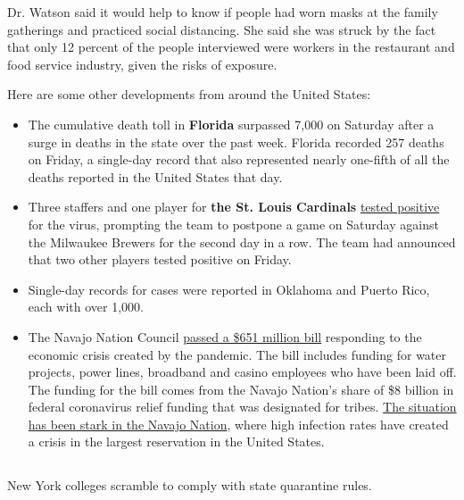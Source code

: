 Dr. Watson said it would help to know if people had worn masks at the
family gatherings and practiced social distancing. She said she was
struck by the fact that only 12 percent of the people interviewed were
workers in the restaurant and food service industry, given the risks of
exposure.

Here are some other developments from around the United States:

\begin{itemize}
\item
  The cumulative death toll in \textbf{Florida} surpassed 7,000 on
  Saturday after a surge in deaths in the state over the past week.
  Florida recorded 257 deaths on Friday, a single-day record that also
  represented nearly one-fifth of all the deaths reported in the United
  States that day.
\item
  Three staffers and one player for \textbf{the St. Louis Cardinals}
  \href{https://www.nytimes.com/2020/08/01/sports/baseball/coronavirus-cardinals.html}{tested
  positive} for the virus, prompting the team to postpone a game on
  Saturday against the Milwaukee Brewers for the second day in a row.
  The team had announced that two other players tested positive on
  Friday.
\item
  Single-day records for cases were reported in Oklahoma and Puerto
  Rico, each with over 1,000.
\item
  The Navajo Nation Council
  \href{https://apnews.com/d8322c62b4f30f5c92ad234bb1f575e0https://apnews.com/d8322c62b4f30f5c92ad234bb1f575e0}{passed
  a \$651 million bill} responding to the economic crisis created by the
  pandemic. The bill includes funding for water projects, power lines,
  broadband and casino employees who have been laid off. The funding for
  the bill comes from the Navajo Nation's share of \$8 billion in
  federal coronavirus relief funding that was designated for tribes.
  \href{https://www.nytimes.com/2020/04/09/us/coronavirus-navajo-nation.html}{The
  situation has been stark in the Navajo Nation}, where high infection
  rates have created a crisis in the largest reservation in the United
  States.
\end{itemize}

\hypertarget{-9}{%
\subsection{}\label{-9}}

New York colleges scramble to comply with state quarantine rules.

